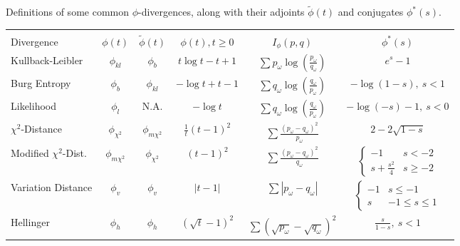 \documentclass[ijoc,nonblindrev]{informs3} %
\begin{document}
\begin{table}
	\TABLE
	{
		Definitions of some common $\phi$-divergences, along with their adjoints $\tilde{\phi}(t)$ and conjugates $\phi^*(s)$.
		\label{tb:phi_definitions}
	}
	{\begin{tabular}{lccccc}
		\hline \\
		Divergence                        & $\phi(t)$          & $\tilde{\phi}(t)$               & $\phi(t), t \geq 0$   & $I_\phi(p,q)$     & $\phi^*(s)$ \\
		\hline
		Kullback-Leibler                  & $\phi_{kl}$        & $\phi_b$                        & $t\log t - t + 1$     & $\sum p_\omega \log\left(\frac{p_\omega}{q_\omega}\right)$ & $e^s - 1$ \\
		Burg Entropy                      & $\phi_b$           & $\phi_{kl}$                     & $-\log t + t - 1$     & $\sum q_\omega \log\left(\frac{q_\omega}{p_\omega}\right)$ & $-\log(1-s),\ s < 1$  \\
		Likelihood                        & $\phi_l$           & N.A.                      & $-\log t$             & $\sum q_\omega \log\left(\frac{q_\omega}{p_\omega}\right)$ & $-\log(-s) - 1,\ s < 0$ \\
		$\chi^2$-Distance                 & $\phi_{\chi^2}$    & $\phi_{m\chi^2}$                & $\frac{1}{t} (t-1)^2$ & $\sum \frac{(p_\omega-q_\omega)^2}{p_\omega}$              & $2 - 2\sqrt{1-s}$  \\
		Modified $\chi^2$-Dist.           & $\phi_{m\chi^2}$   & $\phi_{\chi^2}$                 & $(t-1)^2$             & $\sum \frac{(p_\omega - q_\omega)^2}{q_\omega}$            & $\begin{cases} -1 & s < -2 \\ s + \frac{s^2}{4} & s \geq -2 \end{cases}$ \\
		Variation Distance                & $\phi_v$           & $\phi_v$                        & $|t-1|$               & $\sum |p_\omega - q_\omega|$                               & $\begin{cases} -1 & s \leq -1 \\ s & -1 \leq s \leq 1 \end{cases}$ \\
		Hellinger                         & $\phi_h$           & $\phi_h$                        & $(\sqrt{t} - 1)^2$    & $\sum (\sqrt{p_\omega} - \sqrt{q_\omega})^2$               & $\frac{s}{1-s},\ s < 1$ \\
	\hline
	\end{tabular}}
	{}
\end{table}
\end{document}
